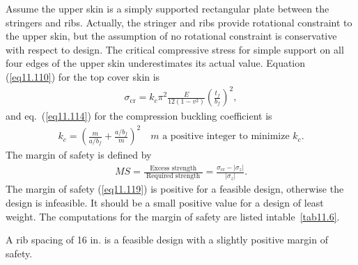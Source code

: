 \documentclass{AeroStructure-ERJohnson}
\begin{document}
\begin{example}
Assume the upper skin is a simply supported rectangular plate between the stringers and ribs. Actually, the stringer and ribs provide rotational constraint to the upper skin, but the assumption of no rotational constraint is conservative with respect to design. The critical compressive stress for simple support on all four edges of the upper skin underestimates its actual value. Equation (\ref{eq11.110}) for the top cover skin is
\begin{align}
\sigma_{\textrm{cr}}=k_{c} \pi^{2} \frac{E}{12\left(1-v^{2}\right)}\left(\frac{t_{f}}{b_{f}}\right)^{2}, \label{eq11.5.g}\tag{g}
\end{align}
and eq.~(\ref{eq11.114}) for the compression buckling coefficient is
\begin{align}
k_{c}=\left(\frac{m}{a/b_{f}}+\frac{a/b_{f}}{m}\right)^{2} \quad m \text { a positive integer to minimize } k_{c}. \label{eq11.5.aa}\tag{a}
\end{align}
The margin of safety is defined by
\begin{align}\label{eq11.119}
MS=\frac{\text { Excess strength }}{\text { Required strength }}=\frac{\sigma_{\mathrm{cr}}-\left|\sigma_{z}\right|}{\left|\sigma_{z}\right|}.
\end{align}
The margin of safety (\ref{eq11.119}) is positive for a feasible design, otherwise the design is infeasible. It should be a small positive value for a design of least weight. The computations for the margin of safety are listed in\break table~\ref{tab11.6}.

\begin{table}[!h]
\vspace*{-1pc}
\end{table}

A rib spacing of 16 in. is a feasible design with a slightly positive margin of safety.
\end{example}
\end{document}
